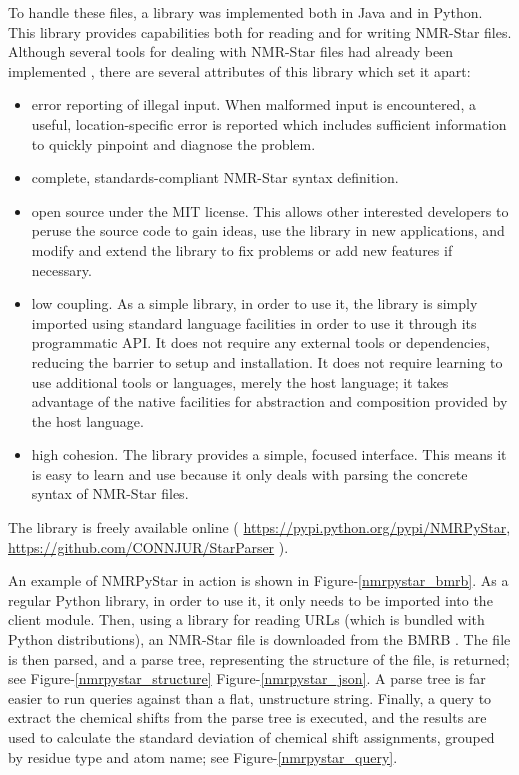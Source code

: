 To handle these files, a library was implemented both in Java 
\cite{fenwick2013} and in Python.  This library provides capabilities both
for reading and for writing NMR-Star files.  Although several tools for
dealing with NMR-Star files had already been implemented \cite{ccpn, bmrb},
there are several attributes of this library which set it apart:
\begin{itemize}
  \item error reporting of illegal input.  When malformed input is encountered,
    a useful, location-specific error is reported which includes sufficient
    information to quickly pinpoint and diagnose the problem.
  \item complete, standards-compliant NMR-Star syntax definition.
  \item open source under the MIT license.  This allows other interested 
    developers to peruse the source code to gain ideas, use the library in
    new applications, and modify and extend the library to fix problems or
    add new features if necessary.
  \item low coupling.  As a simple library, in order to use it, the library
    is simply imported using standard language facilities in order to use
    it through its programmatic API.  It does not require any external tools
    or dependencies, reducing the barrier to setup and installation.  It does
    not require learning to use additional tools or languages, merely the 
    host language; it takes advantage of the native facilities for abstraction
    and composition provided by the host language.
  \item high cohesion.  The library provides a simple, focused interface.
    This means it is easy to learn and use because it only deals with parsing
    the concrete syntax of NMR-Star files.
\end{itemize}
The library is freely available online (
\url{https://pypi.python.org/pypi/NMRPyStar}, 
\url{https://github.com/CONNJUR/StarParser}
).

An example of NMRPyStar in action is shown in Figure-\ref{nmrpystar_bmrb}.
As a regular Python library, in order to use it, it only needs to be 
imported into the client module.  Then, using a library for reading URLs
(which is bundled with Python distributions), an NMR-Star file is downloaded
from the BMRB \cite{bmrb}.  The file is then parsed, and a parse tree, 
representing the structure of the file, is returned; see 
Figure-\ref{nmrpystar_structure} Figure-\ref{nmrpystar_json}.  
A parse tree is far easier to run queries against than a flat,
unstructure string.  Finally, a query to extract the chemical shifts
from the parse tree is executed, and the results are used to calculate the
standard deviation of chemical shift assignments, grouped by residue type
and atom name; see Figure-\ref{nmrpystar_query}.


